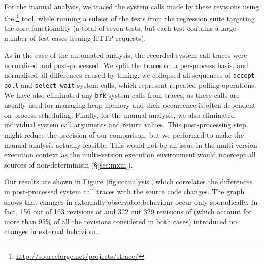 
For the manual analysis, we traced the system calls made by these revisions
using the \strace\footnote{\url{http://sourceforge.net/projects/strace/}} tool,
while running a subset of the tests from the \lighttpd regression suite targeting
the core functionality (a total of seven tests, but each test contains a large
number of test cases issuing HTTP requests).


As in the case of the automated analysis, the recorded system call traces
were normalised and post-processed. We split the traces on a per-process basis,
and normalised all differences caused by timing, \eg we collapsed all sequences
of \lstinline`accept`--\lstinline`poll` and
\lstinline`select`--\lstinline`wait` system calls, which represent repeated
polling operations. We have also eliminated any \lstinline`brk` system calls
from traces, as these calls are usually used for managing heap memory and their
occurrence is often dependent on process scheduling.  Finally, for the manual
analysis, we also eliminated individual system call arguments and return
values. This post-processing step might reduce the precision of our comparison,
but we performed to make the manual analysis actually feasible. This would not
be an issue in the multi-version execution context as the multi-version
execution environment would intercept all sources of non-determinism
(\S\ref{sec:mxm}).

Our results are shown in Figure~\ref{fig:coanalysis}, which correlates the
differences in post-processed system call traces with the source code changes.
The graph shows that changes in externally observable behaviour occur only
sporadically. In fact, 156 out of 163 revisions of \lighttpd and 322
out 329 revisions of \vim (which account for more than 95\% of all the
revisions considered in both cases) introduced no changes in external
behaviour.


